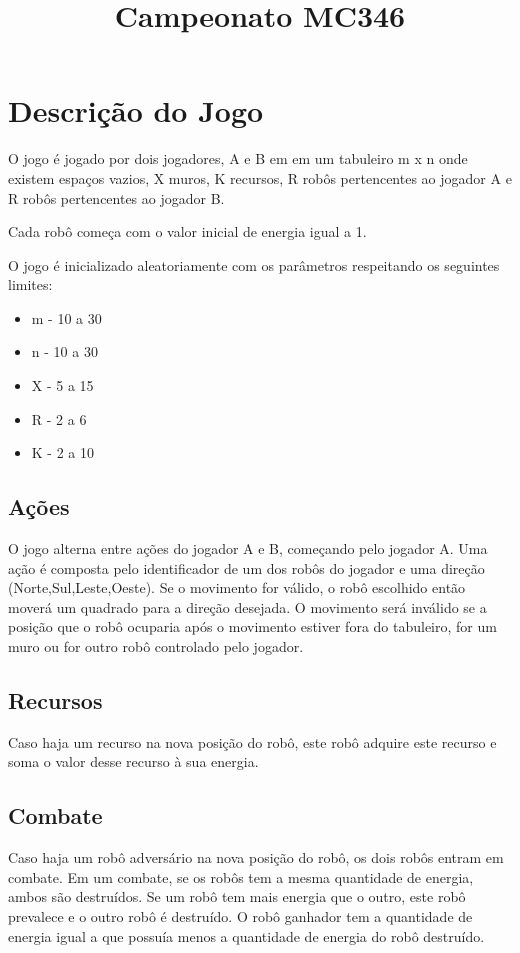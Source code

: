 \documentclass[11pt]{article}
\title{\textbf{Campeonato MC346}}
\date{}
\begin{document}
\maketitle

\section{Descrição do Jogo}

O jogo é jogado por dois jogadores, A e B em em um tabuleiro m x n onde existem espaços vazios, X muros, K recursos, R robôs pertencentes ao jogador A e R robôs pertencentes ao jogador B.

Cada robô começa com o valor inicial de energia igual a 1.

O jogo é inicializado aleatoriamente com os parâmetros respeitando os seguintes limites:
\begin{itemize}
\item{m - 10 a 30}
\item{n - 10 a 30}
\item{X - 5 a 15}
\item{R - 2 a 6}
\item{K - 2 a 10}
\end{itemize}

\subsection{Ações}
O jogo alterna entre ações do jogador A e B, começando pelo jogador A. Uma ação é composta pelo identificador de um dos robôs do jogador e uma direção (Norte,Sul,Leste,Oeste). Se o movimento for válido, o robô escolhido então moverá um quadrado para a direção desejada. O movimento será inválido se a posição que o robô ocuparia após o movimento estiver fora do tabuleiro, for um muro ou for outro robô controlado pelo jogador.

\subsection{Recursos}
Caso haja um recurso na nova posição do robô, este robô adquire este recurso e soma o valor desse recurso à sua energia.

\subsection{Combate}
Caso haja um robô adversário na nova posição do robô, os dois robôs entram em combate. Em um combate, se os robôs tem a mesma quantidade de energia, ambos são destruídos. Se um robô tem mais energia que o outro, este robô prevalece e o outro robô é destruído. O robô ganhador tem a quantidade de energia igual a que possuía menos a quantidade de energia do robô destruído.
\end{document}
